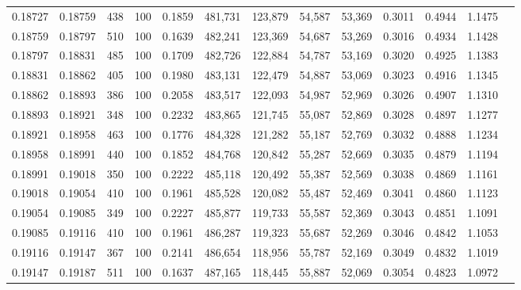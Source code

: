 \begin{tabular}{rrrrrrrrrrrrr}
0.18727 & 0.18759 &   438 & 100 &                                     0.1859 & 481,731 & 123,879 &  54,587 &  53,369 & 0.3011 & 0.4944 & 1.1475 \\
0.18759 & 0.18797 &   510 & 100 &                                     0.1639 & 482,241 & 123,369 &  54,687 &  53,269 & 0.3016 & 0.4934 & 1.1428 \\
0.18797 & 0.18831 &   485 & 100 &                                     0.1709 & 482,726 & 122,884 &  54,787 &  53,169 & 0.3020 & 0.4925 & 1.1383 \\
0.18831 & 0.18862 &   405 & 100 &                                     0.1980 & 483,131 & 122,479 &  54,887 &  53,069 & 0.3023 & 0.4916 & 1.1345 \\
0.18862 & 0.18893 &   386 & 100 &                                     0.2058 & 483,517 & 122,093 &  54,987 &  52,969 & 0.3026 & 0.4907 & 1.1310 \\
0.18893 & 0.18921 &   348 & 100 &                                     0.2232 & 483,865 & 121,745 &  55,087 &  52,869 & 0.3028 & 0.4897 & 1.1277 \\
0.18921 & 0.18958 &   463 & 100 &                                     0.1776 & 484,328 & 121,282 &  55,187 &  52,769 & 0.3032 & 0.4888 & 1.1234 \\
0.18958 & 0.18991 &   440 & 100 &                                     0.1852 & 484,768 & 120,842 &  55,287 &  52,669 & 0.3035 & 0.4879 & 1.1194 \\
0.18991 & 0.19018 &   350 & 100 &                                     0.2222 & 485,118 & 120,492 &  55,387 &  52,569 & 0.3038 & 0.4869 & 1.1161 \\
0.19018 & 0.19054 &   410 & 100 &                                     0.1961 & 485,528 & 120,082 &  55,487 &  52,469 & 0.3041 & 0.4860 & 1.1123 \\
0.19054 & 0.19085 &   349 & 100 &                                     0.2227 & 485,877 & 119,733 &  55,587 &  52,369 & 0.3043 & 0.4851 & 1.1091 \\
0.19085 & 0.19116 &   410 & 100 &                                     0.1961 & 486,287 & 119,323 &  55,687 &  52,269 & 0.3046 & 0.4842 & 1.1053 \\
0.19116 & 0.19147 &   367 & 100 &                                     0.2141 & 486,654 & 118,956 &  55,787 &  52,169 & 0.3049 & 0.4832 & 1.1019 \\
0.19147 & 0.19187 &   511 & 100 &                                     0.1637 & 487,165 & 118,445 &  55,887 &  52,069 & 0.3054 & 0.4823 & 1.0972 \\

\end{tabular}
